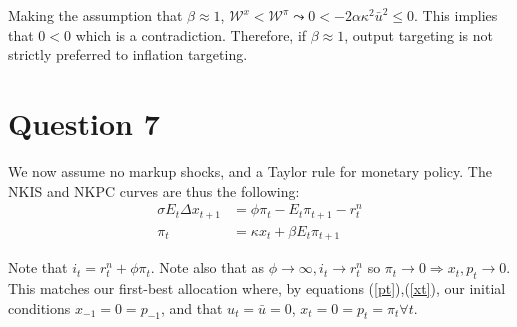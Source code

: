 \documentclass[11pt]{article} %
\begin{document}
Making the assumption that $\beta \approx 1 $, $\mathcal{W}^{x} < \mathcal{W}^{\pi} \leadsto 0< -2\alpha\kappa^2  \bar{u}^2 \leq0$. This implies that $0<0$ which is a contradiction. Therefore, if $\beta \approx 1$, output targeting is not strictly preferred to inflation targeting.
\section{Question 7}
We now assume no markup shocks, and a Taylor rule for monetary policy. The NKIS and NKPC curves are thus the following:
\begin{align*}
\sigma E_t \Delta x_{t+1} &= \phi \pi_t - E_t\pi_{t+1} - r_t^n\\
\pi_t &= \kappa x_t + \beta E_t\pi_{t+1}
\end{align*}

Note that $i_t = r_t^n + \phi \pi_t$. Note also that as $\phi \rightarrow \infty, i_t \rightarrow r_t^n$ so $\pi_t \rightarrow 0 \Rightarrow x_t,p_t \rightarrow 0$. This matches our first-best allocation where, by equations (\ref{pt}),(\ref{xt}), our initial conditions $x_{-1} = 0 = p_{-1}$, and that $u_t = \bar{u} = 0$, $x_t = 0 = p_t = \pi_t \forall t$.
\end{document}
